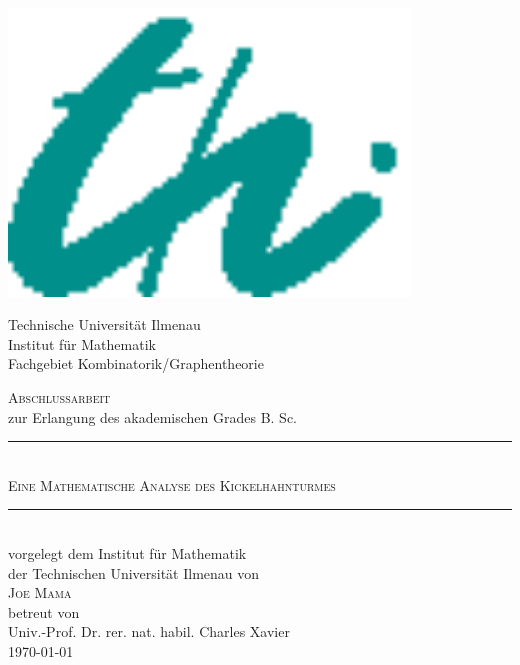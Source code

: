 \begin{titlepage}
\enlargethispage{\baselineskip} 
\large
\hspace{0.2cm}
\begin{minipage}{3.5cm}
\includegraphics[width=0.8\textwidth]{./Appearance/Logo2.eps}
\end{minipage}
\begin{minipage}{11cm}
\vspace{0.8cm}
\small
{Technische Universit\"at Ilmenau\\}
Institut f\"ur Mathematik\\
Fachgebiet Kombinatorik/Graphentheorie\\
\end{minipage}
\begin{center}
\vspace{.5cm}
{\huge \scshape Abschlussarbeit}\\
\vspace{0.4cm}
{\large zur Erlangung des akademischen Grades B. Sc.}\\
\vspace{1.2cm}
\rule{\linewidth}{0.2pt}\\
\vspace{0.8cm} {\Huge \scshape Eine Mathematische Analyse des Kickelhahnturmes\\}
\vspace{0.8cm}
\rule{\linewidth}{0.2pt}\\
\vspace{1.2cm}
{\small vorgelegt dem Institut für Mathematik\\
der Technischen Universität Ilmenau von\\}
\vspace{0.4cm}
{\Large \scshape Joe Mama}\\
\vspace{0.6cm}
{\small betreut von\\}
\vspace{0.2cm}
{\large Univ.-Prof. Dr. rer. nat. habil. Charles Xavier}\\
\vspace{0.6cm}
\today
\end{center}
\end{titlepage}